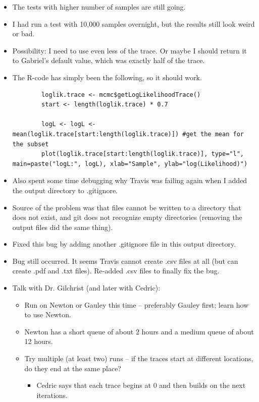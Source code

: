 \documentclass[12pt,hyperref]{labbook}
\begin{document}
\begin{itemize}
    \item The tests with higher number of samples are still going.
    \item I had run a test with 10,000 samples overnight, but the results still look weird or bad.
    \item Possibility: I need to use even less of the trace. Or maybe I should return it to Gabriel's default value, which was exactly half of the trace.
    \item The R-code has simply been the following, so it should work. 
    \begin{lstlisting}
        loglik.trace <- mcmc$getLogLikelihoodTrace()
        start <- length(loglik.trace) * 0.7 
      
        logL <- logL <- mean(loglik.trace[start:length(loglik.trace)]) #get the mean for the subset
        plot(loglik.trace[start:length(loglik.trace)], type="l", main=paste("logL:", logL), xlab="Sample", ylab="log(Likelihood)")
    \end{lstlisting}
    \item Also spent some time debugging why Travis was failing again when I added the output directory to .gitignore.
    \item Source of the problem was that files cannot be written to a directory that does not exist, and git does not recognize empty directories (removing the output files did the same thing).
    \item Fixed this bug by adding another .gitignore file in this output directory.
    \item Bug still occurred. It seems Travis cannot create .csv files at all (but can create .pdf and .txt files). Re-added .csv files to finally fix the bug.
    \item Talk with Dr. Gilchrist (and later with Cedric):
    \begin{itemize}
        \item Run on Newton or Gauley this time -- preferably Gauley first; learn how to use Newton.
        \item Newton has a short queue of about 2 hours and a medium queue of about 12 hours.
        \item Try multiple (at least two) runs -- if the traces start at different locations, do they end at the same place?
        \begin{itemize}
            \item Cedric says that each trace begins at 0 and then builds on the next iterations. 

\end{itemize}
\end{itemize}
\end{itemize}
\end{document}
